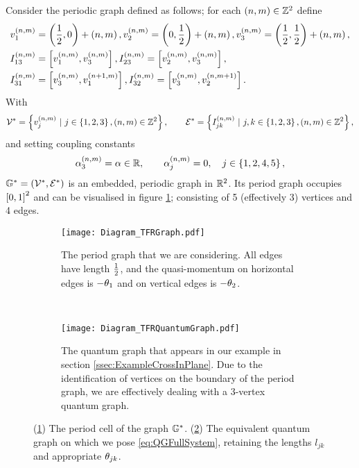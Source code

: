 Consider the periodic graph defined as follows; for each $\left( n,m \right)\in\mathbb{Z}^2$ define
\begin{align*}
	& v_1^{\left( n,m \right)} = \left( \frac{1}{2},0 \right) + \left( n,m \right), 
	v_2^{\left( n,m \right)} = \left( 0,\frac{1}{2} \right) + \left( n,m \right),
	v_3^{\left( n,m \right)} = \left( \frac{1}{2},\frac{1}{2} \right) + \left( n,m \right), \\
	& I_{13}^{\left( n,m \right)} = \left[ v_1^{\left( n,m \right)}, v_3^{\left( n,m \right)} \right],
	I_{23}^{\left( n,m \right)} = \left[ v_2^{\left( n,m \right)}, v_3^{\left( n,m \right)} \right], \\
	& I_{31}^{\left( n,m \right)} = \left[ v_3^{\left( n,m \right)}, v_1^{\left( n+1,m \right)} \right],
	I_{32}^{\left( n,m \right)} = \left[ v_3^{\left( n,m \right)}, v_2^{\left( n,m+1 \right)} \right].
\end{align*}
With 
\begin{align*}
	\vertSet^* = \clbracs{v_j^{\bracs{n,m}} \ \vert \ j\in\clbracs{1,2,3}, \bracs{n,m}\in\integers^2},
	\qquad \edgeSet^* = \clbracs{I_{jk}^{\bracs{n,m}} \ \vert \ j,k\in\clbracs{1,2,3}, \bracs{n,m}\in\integers^2},
\end{align*}
and setting coupling constants
\begin{align*}
	\alpha_3^{\left( n,m \right)} = \alpha \in\mathbb{R}, 
	\qquad \alpha_j^{\left( n,m \right)} = 0, \quad j\in\left\{ 1,2,4,5 \right\},
\end{align*}
$\mathbb{G}^* = \left( \mathcal{V}^*,\mathcal{E}^* \right)$ is an embedded, periodic graph in $\mathbb{R}^2$.
Its period graph occupies $\left[ 0,1 \right]^2$ and can be visualised in figure \ref{fig:Diagram_TFRGraph}; consisting of 5 (effectively 3) vertices and 4 edges.
\begin{figure}[b!]
	\centering
	\begin{subfigure}[t]{0.45\textwidth}
		\centering
		\texttt{[image: Diagram\_TFRGraph.pdf]}
		\caption{\label{fig:Diagram_TFRGraph} The period graph that we are considering. All edges have length $\frac{1}{2}$, and the quasi-momentum on horizontal edges is $-\theta_1$ and on vertical edges is $-\theta_2$.}
	\end{subfigure}
	~
	\begin{subfigure}[t]{0.45\textwidth}
		\centering
		\texttt{[image: Diagram\_TFRQuantumGraph.pdf]}
		\caption{\label{fig:Diagram_TFRQuantumGraph} The quantum graph that appears in our example in section \ref{ssec:ExampleCrossInPlane}. Due to the identification of vertices on the boundary of the period graph, we are effectively dealing with a 3-vertex quantum graph.}
	\end{subfigure}
	\caption{\label{fig:5VertexCross} (\ref{fig:Diagram_TFRGraph}) The period cell of the graph $\mathbb{G}^*$. (\ref{fig:Diagram_TFRQuantumGraph}) The equivalent quantum graph on which we pose \eqref{eq:QGFullSystem}, retaining the lengths $l_{jk}$ and appropriate $\theta_{jk}$.}
\end{figure}
